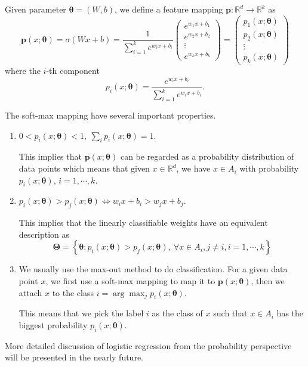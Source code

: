 \begin{definition}
 Given parameter $\bm\theta = (W,b)$, we define a feature mapping $\bm p: \mathbb{R}^d \rightarrow \mathbb{R}^k$ as
 \begin{equation}
 \bm p(x; \bm\theta)  = \sigma(Wx+b) = \frac{1}{\sum\limits_{i=1}^k e^{w_i x+b_i}}
 \begin{pmatrix}
 e^{w_1 x+b_1}\\
 e^{w_2 x+b_2}\\
 \vdots\\
 e^{w_k x+b_k}
 \end{pmatrix}
 = \begin{pmatrix}
 p_1(x; \bm\theta) \\
 p_2(x; \bm\theta) \\
 \vdots \\
 p_k(x; \bm\theta)
 \end{pmatrix}
 \end{equation}
 where the $i$-th component 
 \begin{equation}\label{key}
 p_i(x; \bm\theta) = \frac{e^{w_i x+b_i}}{\sum\limits_{i=1}^k e^{w_i x+b_i}}.
 \end{equation}
\end{definition}



The soft-max mapping have several important properties.
\begin{enumerate}
	\item 
	$\displaystyle 0< p_i(x; \bm\theta) <1,~\sum_i p_i(x; \bm\theta) = 1$. 
	
	This implies that $\bm p(x; \bm\theta)$ can be regarded as a probability distribution of data points which means that given $x\in \mathbb{R}^d$, we have $x\in A_i$ with probability $p_i(x; \bm{\theta})$, $i = 1,\cdots,k$. 
	\item 
	$p_i(x; \bm\theta)>p_j(x; \bm\theta)\Leftrightarrow w_ix+b_i>w_j x+b_j.$
	
	This implies that the linearly classifiable weights have an equivalent description as
	\begin{equation}
	\bm{\Theta} = \left\{\bm\theta: p_i(x; \bm\theta)>p_j(x; \bm\theta),~\forall x\in A_i, j\neq i, i= 1,\cdots,k\right\}
	\end{equation}
	\item We usually use the max-out method to do classification. For a given data point $x$, we first use a soft-max mapping to map it to $\bm p(x; \bm\theta)$, then we attach $x$ to the class $i= \arg\max_j p_i(x; \bm\theta)$. 
	
	This means that we pick the label $i$ as the class of $x$ such that $x\in A_i$ has the biggest probability $p_i(x; \bm\theta)$.
\end{enumerate}
More detailed discussion of logistic regression from the probability perspective will be presented in the nearly future. 


